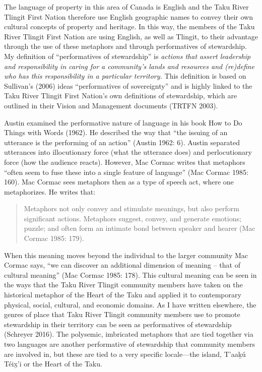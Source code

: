 The language of property in this area of Canada is English and the Taku River Tlingit First Nation therefore use English geographic names to convey their own cultural concepts of property and heritage. In this way, the members of the Taku River Tlingit First Nation are using English, as well as Tlingit, to their advantage through the use of these metaphors and through performatives of stewardship. My definition of “performatives of stewardship” is \textit{actions that assert leadership and responsibility in caring for a community’s lands and resources and (re)define who has this responsibility in a particular territory. }This definition is based on Sullivan’s (2006) ideas “performatives of sovereignty” and is highly linked to the Taku River Tlingit First Nation’s own definitions of stewardship, which are outlined in their Vision and Management documents (TRTFN 2003). \

Austin examined the performative nature of language in his book How to Do Things with Words (1962). He described the way that “the issuing of an utterance is the performing of an action” (Austin 1962: 6). Austin separated utterances into illocutionary force (what the utterance does) and perlocutionary force (how the audience reacts). However, Mac Cormac writes that metaphors “often seem to fuse these into a single feature of language” (Mac Cormac 1985: 160). Mac Cormac sees metaphors then as a type of speech act, where one metaphorizes. He writes that:

\begin{quote}
Metaphors not only convey and stimulate meanings, but also perform significant actions. Metaphors suggest, convey, and generate emotions; puzzle; and often form an intimate bond between speaker and hearer (Mac Cormac 1985: 179).
\end{quote}

When this meaning moves beyond the individual to the larger community Mac Cormac says, “we can discover an additional dimension of meaning – that of cultural meaning” (Mac Cormac 1985: 178). This cultural meaning can be seen in the ways that the Taku River Tlingit community members have taken on the historical metaphor of the Heart of the Taku and applied it to contemporary physical, social, cultural, and economic domains. As I have written elsewhere, the genres of place that Taku River Tlingit community members use to promote stewardship in their territory can be seen as performatives of stewardship (Schreyer 2016). The polysemic, imbricated metaphors that are tied together via two languages are another performative of stewardship that community members are involved in, but these are tied to a very specific locale---the island, T'aak̲ú Téix̲'i or the Heart of the Taku.


